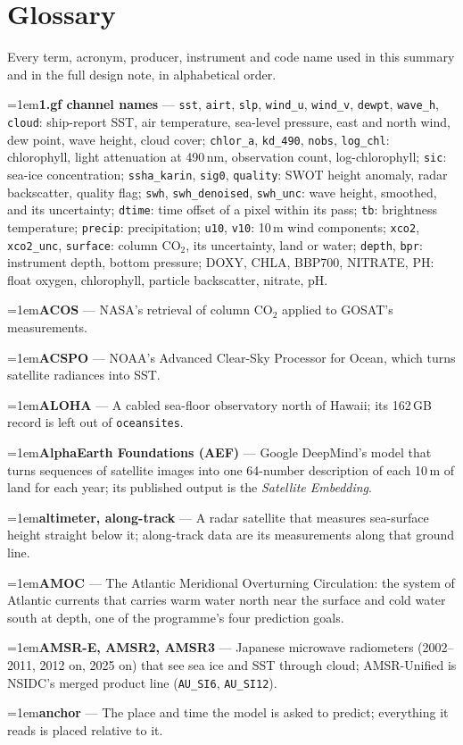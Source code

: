 \documentclass[10pt]{article}
\newcommand{\code}[1]{\texttt{#1}}
\newcommand{\gl}[2]{\par\hangindent=1em\hangafter=1\textbf{#1} --- #2\par}
\begin{document}
\clearpage
{}\label{glossary}
\section*{Glossary}
Every term, acronym, producer, instrument and code name used in this summary and in the full design note, in alphabetical order.
\small
\gl{1.gf channel names}{\code{sst}, \code{airt}, \code{slp}, \code{wind\_u}, \code{wind\_v}, \code{dewpt}, \code{wave\_h}, \code{cloud}: ship-report SST, air temperature, sea-level pressure, east and north wind, dew point, wave height, cloud cover; \code{chlor\_a}, \code{kd\_490}, \code{nobs}, \code{log\_chl}: chlorophyll, light attenuation at 490\,nm, observation count, log-chlorophyll; \code{sic}: sea-ice concentration; \code{ssha\_karin}, \code{sig0}, \code{quality}: SWOT height anomaly, radar backscatter, quality flag; \code{swh}, \code{swh\_denoised}, \code{swh\_unc}: wave height, smoothed, and its uncertainty; \code{dtime}: time offset of a pixel within its pass; \code{tb}: brightness temperature; \code{precip}: precipitation; \code{u10}, \code{v10}: 10\,m wind components; \code{xco2}, \code{xco2\_unc}, \code{surface}: column CO$_2$, its uncertainty, land or water; \code{depth}, \code{bpr}: instrument depth, bottom pressure; DOXY, CHLA, BBP700, NITRATE, PH: float oxygen, chlorophyll, particle backscatter, nitrate, pH.}
\gl{ACOS}{NASA's retrieval of column CO$_2$ applied to GOSAT's measurements.}
\gl{ACSPO}{NOAA's Advanced Clear-Sky Processor for Ocean, which turns satellite radiances into SST.}
\gl{ALOHA}{A cabled sea-floor observatory north of Hawaii; its 162\,GB record is left out of \code{oceansites}.}
\gl{AlphaEarth Foundations (AEF)}{Google DeepMind's model that turns sequences of satellite images into one 64-number description of each 10\,m of land for each year; its published output is the \emph{Satellite Embedding}.}
\gl{altimeter, along-track}{A radar satellite that measures sea-surface height straight below it; along-track data are its measurements along that ground line.}
\gl{AMOC}{The Atlantic Meridional Overturning Circulation: the system of Atlantic currents that carries warm water north near the surface and cold water south at depth, one of the programme's four prediction goals.}
\gl{AMSR-E, AMSR2, AMSR3}{Japanese microwave radiometers (2002--2011, 2012 on, 2025 on) that see sea ice and SST through cloud; AMSR-Unified is NSIDC's merged product line (\code{AU\_SI6}, \code{AU\_SI12}).}
\gl{anchor}{The place and time the model is asked to predict; everything it reads is placed relative to it.}
\end{document}
